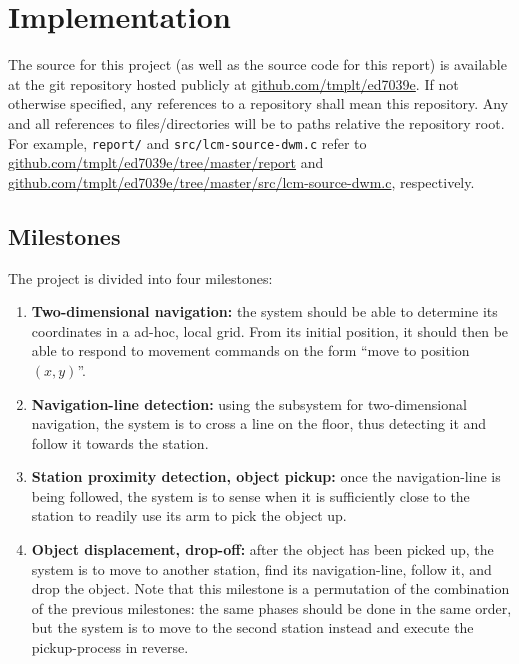 \section{Implementation}
The source for this project (as well as the source code for this report) is available at the git repository hosted publicly at \href{https://github.com/tmplt/ed7039e}{github.com/tmplt/ed7039e}.
If not otherwise specified, any references to a repository shall mean this repository.
Any and all references to files/directories will be to paths relative the repository root.
For example, \texttt{report/} and \texttt{src/lcm-source-dwm.c} refer to \href{https://github.com/tmplt/ed7039e/tree/master/report}{github.com/tmplt/ed7039e/tree/master/report} and \href{https://github.com/tmplt/ed7039e/tree/master/src/lcm-source-dwm.c}{github.com/tmplt/ed7039e/tree/master/src/lcm-source-dwm.c}, respectively.


\subsection{Milestones}
The project is divided into four milestones:
\begin{enumerate}
\item \textbf{Two-dimensional navigation:}
  the system should be able to determine its coordinates in a ad-hoc, local grid.
  From its initial position, it should then be able to respond to movement commands on the form ``move to position $(x, y)$''.

\item \textbf{Navigation-line detection:}
  using the subsystem for two-dimensional navigation, the system is to cross a line on the floor,
  thus detecting it and follow it towards the station.

\item \textbf{Station proximity detection, object pickup:}
  once the navigation-line is being followed, the system is to sense when it is sufficiently close to the station to readily use its arm to pick the object up.

\item \textbf{Object displacement, drop-off:}
  after the object has been picked up, the system is to move to another station, find its navigation-line, follow it, and drop the object.
  Note that this milestone is a permutation of the combination of the previous milestones: the same phases should be done in the same order,
  but the system is to move to the second station instead and execute the pickup-process in reverse.
\end{enumerate}

